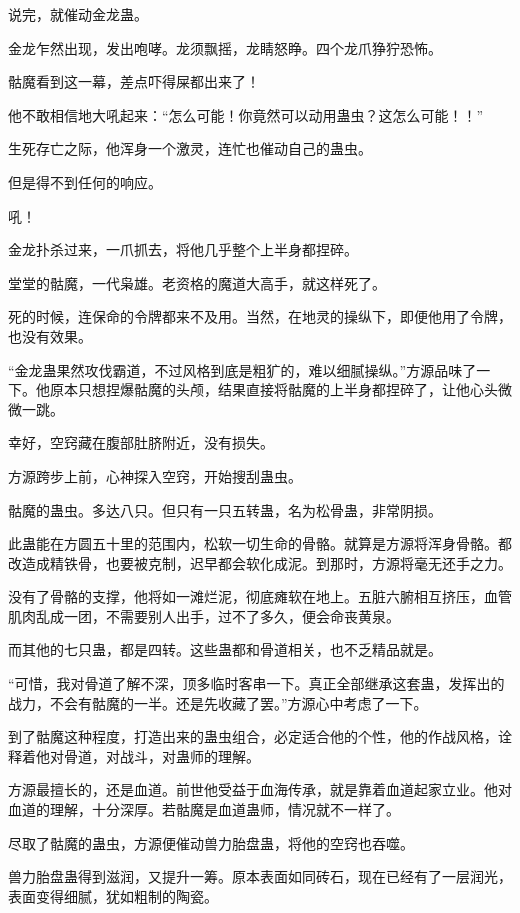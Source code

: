 \begin{this_body}
说完，就催动金龙蛊。

金龙乍然出现，发出咆哮。龙须飘摇，龙睛怒睁。四个龙爪狰狞恐怖。

骷魔看到这一幕，差点吓得屎都出来了！

他不敢相信地大吼起来：“怎么可能！你竟然可以动用蛊虫？这怎么可能！！”

生死存亡之际，他浑身一个激灵，连忙也催动自己的蛊虫。

但是得不到任何的响应。

吼！

金龙扑杀过来，一爪抓去，将他几乎整个上半身都捏碎。

堂堂的骷魔，一代枭雄。老资格的魔道大高手，就这样死了。

死的时候，连保命的令牌都来不及用。当然，在地灵的操纵下，即便他用了令牌，也没有效果。

“金龙蛊果然攻伐霸道，不过风格到底是粗犷的，难以细腻操纵。”方源品味了一下。他原本只想捏爆骷魔的头颅，结果直接将骷魔的上半身都捏碎了，让他心头微微一跳。

幸好，空窍藏在腹部肚脐附近，没有损失。

方源跨步上前，心神探入空窍，开始搜刮蛊虫。

骷魔的蛊虫。多达八只。但只有一只五转蛊，名为松骨蛊，非常阴损。

此蛊能在方圆五十里的范围内，松软一切生命的骨骼。就算是方源将浑身骨骼。都改造成精铁骨，也要被克制，迟早都会软化成泥。到那时，方源将毫无还手之力。

没有了骨骼的支撑，他将如一滩烂泥，彻底瘫软在地上。五脏六腑相互挤压，血管肌肉乱成一团，不需要别人出手，过不了多久，便会命丧黄泉。

而其他的七只蛊，都是四转。这些蛊都和骨道相关，也不乏精品就是。

“可惜，我对骨道了解不深，顶多临时客串一下。真正全部继承这套蛊，发挥出的战力，不会有骷魔的一半。还是先收藏了罢。”方源心中考虑了一下。

到了骷魔这种程度，打造出来的蛊虫组合，必定适合他的个性，他的作战风格，诠释着他对骨道，对战斗，对蛊师的理解。

方源最擅长的，还是血道。前世他受益于血海传承，就是靠着血道起家立业。他对血道的理解，十分深厚。若骷魔是血道蛊师，情况就不一样了。

尽取了骷魔的蛊虫，方源便催动兽力胎盘蛊，将他的空窍也吞噬。

兽力胎盘蛊得到滋润，又提升一筹。原本表面如同砖石，现在已经有了一层润光，表面变得细腻，犹如粗制的陶瓷。


\end{this_body}
